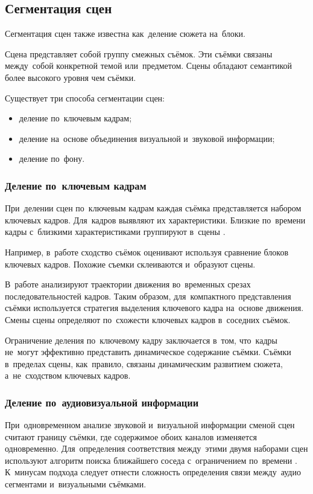 \subsection{Сегментация сцен}

Сегментация сцен также известна как~деление сюжета на~блоки.

Сцена представляет собой группу смежных съёмок.
Эти съёмки связаны между~собой конкретной темой или~предметом.
Сцены обладают семантикой более высокого уровня чем съёмки.

Существует три способа сегментации сцен:
\begin{itemize}
    \item деление по~ключевым кадрам;
    \item деление на~основе объединения визуальной и~звуковой информации;
    \item деление по~фону.
\end{itemize}


\subsubsection{Деление по~ключевым кадрам}

При~делении сцен по~ключевым кадрам каждая съёмка представляется набором
ключевых кадров. Для~кадров выявляют их характеристики.
Близкие по~времени кадры с~близкими
характеристиками группируют в~сцены \cite{Truong:2003}.

Например, в~работе \cite{Hanjalic:2002} сходство съёмок оценивают
используя сравнение блоков ключевых кадров.
Похожие съемки склеиваются и~образуют сцены.

В~работе \cite{Ngo:2000} анализируют траектории движения
во~временных срезах последовательностей кадров.
Таким образом, для~компактного представления съёмки
используется стратегия выделения ключевого кадра на~основе движения.
Смены сцены определяют по~схожести ключевых кадров в~соседних съёмок.


Ограничение деления по~ключевому кадру заключается в~том, что~кадры
не~могут эффективно представить динамическое содержание съёмки.
Съёмки в~пределах сцены, как~правило, связаны динамическим развитием сюжета,
а~не~сходством ключевых кадров.


\subsubsection{Деление по~аудиовизуальной информации}

При~одновременном анализе звуковой и~визуальной информации сменой сцен считают
границу съёмки, где содержимое обоих каналов изменяется одновременно.
Для~определения соответствия между~этими двумя наборами сцен
используют алгоритм поиска ближайшего соседа
с~ограничением по~времени \cite{Sundaram:2000}.
К~минусам подхода следует отнести сложность
определения связи между~аудио сегментами и~визуальными съёмками.


